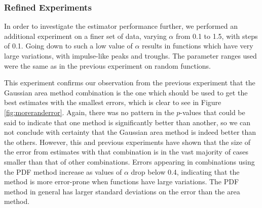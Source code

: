 \documentclass[a4paper,11pt]{article}
\begin{document}
\subsubsection{Refined Experiments}
\label{sec-8-2-2}

    In order to investigate the estimator performance further, we performed an
    additional experiment on a finer set of data, varying $\alpha$ from 0.1 to
    1.5, with steps of 0.1. Going down to such a low value of $\alpha$ results
    in functions which have very large variations, with impulse-like peaks and
    troughs. The parameter ranges used were the same as in the previous
    experiment on random functions.

    This experiment confirms our observation from the previous experiment that the
    Gaussian area method combination is the one which should be used to get the best
    estimates with the smallest errors, which is clear to see in Figure
    \ref{fig:moreranderror}. Again, there was no pattern in the $p$-values that
    could be said to indicate that one method is significantly better than another,
    so we can not conclude with certainty that the Gaussian area method is indeed
    better than the others. However, this and previous experiments have shown that
    the size of the error from estimates with that combination is in the vast
    majority of cases smaller than that of other combinations. Errors appearing in
    combinations using the PDF method increase as values of $\alpha$ drop below 0.4,
    indicating that the method is more error-prone when functions have large
    variations. The PDF method in general has larger standard deviations on the
    error than the area method.
\end{document}

